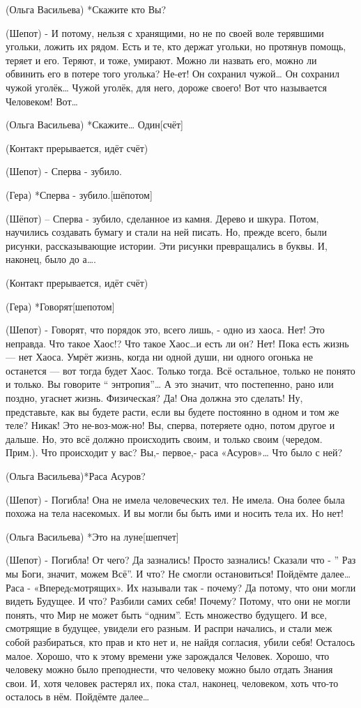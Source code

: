(Ольга Васильева) *Скажите кто Вы?

(Шепот) - И потому, нельзя с хранящими, но не по своей воле терявшими угольки, ложить их рядом. Есть и те, кто держат угольки, но протянув помощь, теряет и его. Теряют, и тоже, умирают. Можно ли назвать его, можно ли обвинить его в потере того уголька? Не-ет! Он сохранил чужой… Он сохранил чужой уголёк… Чужой уголёк, для него, дороже своего! Вот что называется Человеком! Вот… 

(Ольга Васильева) *Скажите… Один[счёт]

(Контакт прерывается, идёт счёт)

(Шепот) - Сперва - зубило.

(Гера) *Сперва - зубило.[шёпотом]

(Шёпот) – Сперва - зубило, сделанное из камня. Дерево и шкура. Потом, научились создавать бумагу и стали на ней писать. Но, прежде всего,  были рисунки, рассказывающие истории. Эти рисунки превращались в буквы. И, наконец, было до а….


(Контакт прерывается, идёт счёт)


(Гера) *Говорят[шепотом]

(Шепот)  - Говорят, что порядок это, всего лишь, -  одно из хаоса. Нет! Это неправда. Что такое Хаос!? Что такое Хаос…и есть ли он? Нет! Пока есть жизнь — нет Хаоса. Умрёт жизнь, когда ни одной души, ни одного огонька не останется — вот тогда будет Хаос. Только тогда. Всё остальное, только не понято и только.  Вы говорите “ энтропия”… А это значит, что постепенно, рано или поздно, угаснет жизнь. Физическая? Да! Она должна это сделать! Ну, представьте, как вы будете расти, если вы будете постоянно в одном и том же теле? Никак! Это не-воз-мож-но! Вы, сперва, потеряете одно, потом другое и дальше. Но, это всё должно происходить своим, и только своим (чередом. Прим.). Что происходит у вас? Вы,- первое,- раса «Асуров»… Что было с ней?

(Ольга Васильева)*Раса Асуров?

(Шепот) - Погибла! Она не имела человеческих тел. Не имела. Она более была похожа на тела насекомых. И вы могли бы быть ими и носить тела их. Но нет! 

(Ольга Васильева) *Это на луне[шепчет]

(Шепот) - Погибла! От чего? Да зазнались! Просто  зазнались! Сказали что - ” Раз мы Боги, значит, можем Всё”. И что? Не смогли остановиться! Пойдёмте далее… Раса - «Впередcмотрящих». Их называли так  - почему? Да потому, что они могли видеть Будущее. И что? Разбили самих себя! Почему? Потому, что они не могли понять, что Мир не может быть “одним”. Есть множество будущего. И все, смотрящие в будущее, увидели его разным. И распри начались, и стали меж собой разбираться, кто прав и кто нет и, не найдя согласия, убили себя! Осталось малое. Хорошо, что к этому времени уже зарождался Человек. Хорошо, что человеку можно было преподнести, что человеку можно было отдать Знания свои. И, хотя человек растерял их, пока стал, наконец, человеком, хоть что-то  осталось в нём. Пойдёмте далее…


